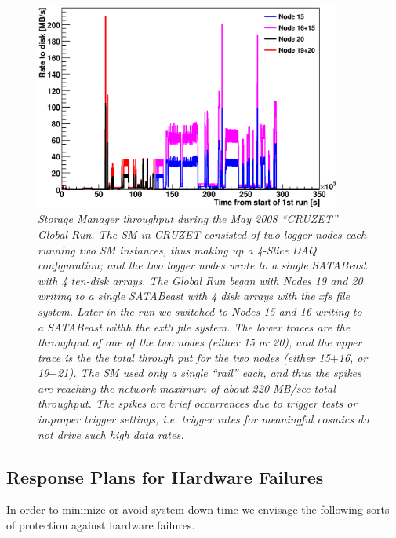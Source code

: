 \begin{figure}[t]
\begin{center}  
\includegraphics[width=0.9\textwidth]{Hardware/cruzetByNode}
\caption{\emph{Storage Manager throughput during the May 2008 ``CRUZET'' Global Run. 
The SM in CRUZET consisted of two logger nodes each running two SM instances,
thus making up a 4-Slice DAQ configuration; and the two logger nodes wrote
to a single SATABeast with 4 ten-disk arrays.
 The Global Run began with Nodes 19 and 20
writing to a single SATABeast with 4 disk arrays with the xfs file system.
Later in the run we switched to Nodes 15 and 16 writing to a SATABeast withh the ext3
file system.
The lower traces are the throughput of one of the two nodes
(either 15 or 20), and the upper trace is the the total through put for
the two nodes (either 15$+$16, or 19$+$21). 
The SM used only a single ``rail'' each, and thus the spikes are reaching the network 
maximum of about 220 MB/sec total throughput. The spikes are brief occurrences
due to trigger tests or improper trigger settings, 
i.e.  trigger rates for meaningful cosmics do not drive such high data rates.}}
\label{fig:cruzet}
\end{center}
\end{figure}  



\subsection{Response Plans for Hardware Failures \label{sec:SMhardfail}}

In order to minimize or avoid system down-time we envisage the following
sorts of protection against hardware failures.


